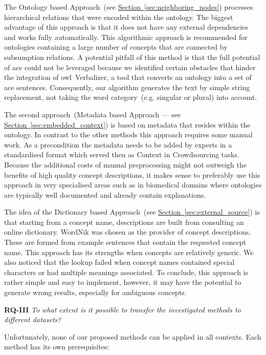 The Ontology based Approach~(see \hyperref[sec:neighboring_nodes]{Section~\ref*{sec:neighboring_nodes}}) processes hierarchical relations that were encoded within the ontology. The biggest advantage of this approach is that it does not have any external dependencies and works fully automatically. This algorithmic approach is recommended for ontologies containing a large number of concepts that are connected by subsumption relations. A potential pitfall of this method is that the full potential of \gls{ace} could not be leveraged because we identified certain obstacles that hinder the integration of \gls{owl}~Verbalizer, a tool that converts an ontology into a set of \gls{ace} sentences. Consequently, our algorithm generates the text by simple string replacement, not taking the word category~(e.g. singular or plural) into account. 

The second approach~(Metadata based Approach --- see \hyperref[sec:embedded_context]{Section~\ref*{sec:embedded_context}})
is based on metadata that resides within the ontology. In contrast to the other methods this approach requires some manual work. As a precondition 
the metadata needs to be added by experts in a standardised format which served then as Context in Crowdsourcing tasks. Because the additional costs of manual preprocessing might not outweigh the benefits of high quality concept descriptions, it makes sense to preferably use this approach in very specialised areas such as in biomedical domains where ontologies are typically well documented and already contain explanations.

The idea of the Dictionary based Approach~(see \hyperref[sec:external_source]{Section~\ref*{sec:external_source}})
is that starting from a concept name, descriptions are built from consulting an online dictionary. WordNik was chosen as the provider of concept descriptions. These are formed from example sentences that contain the requested concept name. This approach has its strengths when concepts are relatively generic. We also noticed that the lookup failed when concept names contained special characters or had multiple meanings associated. 
To conclude, this approach is rather simple and easy to implement, however, it may have the potential to generate wrong results, especially for ambiguous concepts. 


\textbf{RQ-III} \emph{To what extent is it possible to transfer the investigated methods to different datasets?}

Unfortunately, none of our proposed methods can be applied in all contexts. Each method has its own prerequisites:

